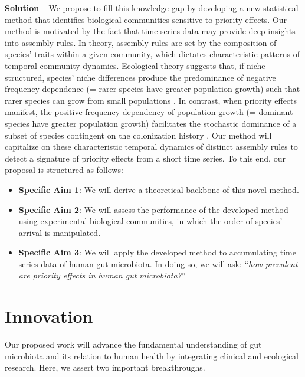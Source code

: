 \documentclass[12pt, class=article, crop=false]{standalone}
\begin{document}
\textbf{Solution} --
\ul{We propose to fill this knowledge gap by developing a new statistical method that identifies biological communities sensitive to priority effects}.
Our method is motivated by the fact that time series data may provide deep insights into assembly rules.
In theory, assembly rules are set by the composition of species' traits within a given community, which dictates characteristic patterns of temporal community dynamics.
Ecological theory suggests that, if niche-structured, species' niche differences produce the predominance of negative frequency dependence (= rarer species have greater population growth) such that rarer species can grow from small populations \citep{loreau_does_2004, carroll_niche_2011, ke_coexistence_2018}.
In contrast, when priority effects manifest, the positive frequency dependency of population growth (= dominant species have greater population growth) facilitates the stochastic dominance of a subset of species contingent on the colonization history \citep{ke_coexistence_2018}.
Our method will capitalize on these characteristic temporal dynamics of distinct assembly rules to detect a signature of priority effects from a short time series.
To this end, our proposal is structured as follows:

\begin{itemize}
    \item \textbf{Specific Aim 1}: We will derive a theoretical backbone of this novel method.
    \item \textbf{Specific Aim 2}: We will assess the performance of the developed method using experimental biological communities, in which the order of species' arrival is manipulated.
    \item \textbf{Specific Aim 3}: We will apply the developed method to accumulating time series data of human gut microbiota. In doing so, we will ask: ``\textit{how prevalent are priority effects in human gut microbiota?}''
\end{itemize}

\section{Innovation}
Our proposed work will advance the fundamental understanding of gut microbiota and its relation to human health by integrating clinical and ecological research.
Here, we assert two important breakthroughs.
\end{document}
